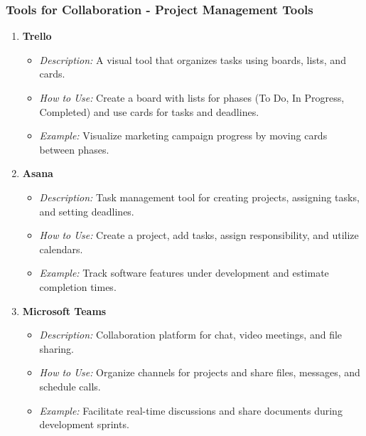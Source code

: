 \documentclass[aspectratio=169]{beamer}
\begin{document}
\begin{frame}[fragile]
    \frametitle{Tools for Collaboration - Project Management Tools}
    \begin{enumerate}
        \item \textbf{Trello}
        \begin{itemize}
            \item \textit{Description:} A visual tool that organizes tasks using boards, lists, and cards.
            \item \textit{How to Use:} Create a board with lists for phases (To Do, In Progress, Completed) and use cards for tasks and deadlines.
            \item \textit{Example:} Visualize marketing campaign progress by moving cards between phases.
        \end{itemize}

        \item \textbf{Asana}
        \begin{itemize}
            \item \textit{Description:} Task management tool for creating projects, assigning tasks, and setting deadlines.
            \item \textit{How to Use:} Create a project, add tasks, assign responsibility, and utilize calendars.
            \item \textit{Example:} Track software features under development and estimate completion times.
        \end{itemize}

        \item \textbf{Microsoft Teams}
        \begin{itemize}
            \item \textit{Description:} Collaboration platform for chat, video meetings, and file sharing.
            \item \textit{How to Use:} Organize channels for projects and share files, messages, and schedule calls.
            \item \textit{Example:} Facilitate real-time discussions and share documents during development sprints.
        \end{itemize}
    \end{enumerate}
\end{frame}
\end{document}
